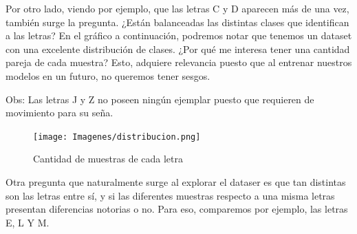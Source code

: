 \documentclass[10pt,a4paper]{article}
\begin{document}
Por otro lado, viendo por ejemplo, que las letras C y D aparecen más de una vez, también surge la pregunta. ¿Están balanceadas las distintas clases que identifican a las letras? En el gráfico a continuación, podremos notar que tenemos un dataset con una excelente distribución de clases. ¿Por qué me interesa
tener una cantidad pareja de cada muestra? Esto, adquiere relevancia puesto que al entrenar nuestros modelos en un futuro, no queremos tener sesgos.
\vspace{0.05cm}
  
Obs: Las letras J y Z no poseen ningún ejemplar puesto que requieren de movimiento para su seña.

\vspace{0.1cm}

\begin{figure}[h]
  \centering
  \texttt{[image: Imagenes/distribucion.png]}
  \caption{Cantidad de muestras de cada letra}
  \label{fig:Tabla 1}
\end{figure}

\newpage

Otra pregunta que naturalmente surge al explorar el dataser es que tan distintas son las letras entre sí, y si las diferentes muestras respecto a una misma letras
presentan diferencias notorias o no. Para eso, comparemos por ejemplo, las letras E, L Y M.
\end{document}
